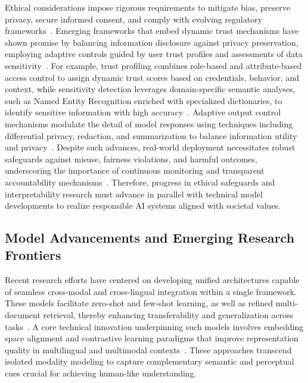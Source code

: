 \documentclass[sigconf]{acmart}
\begin{document}
Ethical considerations impose rigorous requirements to mitigate bias, preserve privacy, secure informed consent, and comply with evolving regulatory frameworks~\cite{ref11,ref12,ref13}. Emerging frameworks that embed dynamic trust mechanisms have shown promise by balancing information disclosure against privacy preservation, employing adaptive controls guided by user trust profiles and assessments of data sensitivity~\cite{ref34}. For example, trust profiling combines role-based and attribute-based access control to assign dynamic trust scores based on credentials, behavior, and context, while sensitivity detection leverages domain-specific semantic analyses, such as Named Entity Recognition enriched with specialized dictionaries, to identify sensitive information with high accuracy~\cite{ref11}. Adaptive output control mechanisms modulate the detail of model responses using techniques including differential privacy, redaction, and summarization to balance information utility and privacy~\cite{ref11}. Despite such advances, real-world deployment necessitates robust safeguards against misuse, fairness violations, and harmful outcomes, underscoring the importance of continuous monitoring and transparent accountability mechanisms~\cite{ref12,ref34}. Therefore, progress in ethical safeguards and interpretability research must advance in parallel with technical model developments to realize responsible AI systems aligned with societal values.

\subsection{Model Advancements and Emerging Research Frontiers}

Recent research efforts have centered on developing unified architectures capable of seamless cross-modal and cross-lingual integration within a single framework. These models facilitate zero-shot and few-shot learning, as well as refined multi-document retrieval, thereby enhancing transferability and generalization across tasks~\cite{ref2,ref4,ref5,ref14,ref28,ref29}. A core technical innovation underpinning such models involves embedding space alignment and contrastive learning paradigms that improve representation quality in multilingual and multimodal contexts~\cite{ref2,ref4,ref5,ref31}. These approaches transcend isolated modality modeling to capture complementary semantic and perceptual cues crucial for achieving human-like understanding.
\end{document}
